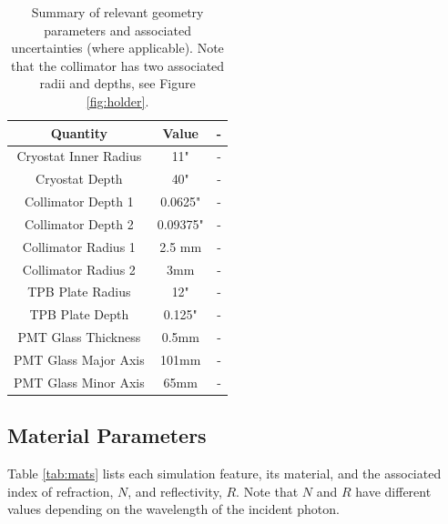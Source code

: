 \documentclass[aps,pra,notitlepage,groupedaddress]{revtex4-1}
\begin{document}
\begin{table}
	\begin{center}
		\begin{tabular}{| c | c | c |}
			\hline
			Quantity	&	Value	&	-	\\
			\hline
			Cryostat Inner Radius	&	11"	&	-	\\
			Cryostat Depth & 40" & - \\
			Collimator Depth 1	&	0.0625"	&	-	\\
			Collimator Depth 2	&	0.09375"	&	-	\\
			Collimator Radius 1 & 2.5 mm & - \\
			Collimator Radius 2 & 3mm & - \\
			TPB Plate Radius & 12" & - \\
			TPB Plate Depth & 0.125" & - \\
			PMT Glass Thickness & 0.5mm & - \\
			PMT Glass Major Axis & 101mm & - \\
			PMT Glass Minor Axis & 65mm & - \\
			\hline
		\end{tabular}
		\caption{Summary of relevant geometry parameters and associated uncertainties (where applicable). Note that the collimator has two associated radii and depths, see Figure \ref{fig:holder}. \label{tab:geo}}
	\end{center}
\end{table}

\subsection{Material Parameters}

Table \ref{tab:mats} lists each simulation feature, its material, and the associated index of refraction, $N$, and reflectivity, $R$. Note that $N$ and $R$ have different values depending on the wavelength of the incident photon.
\end{document}
